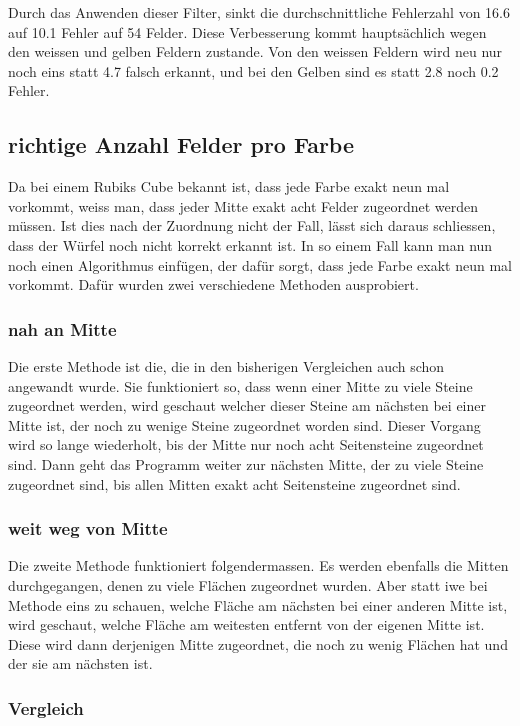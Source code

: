 \documentclass[a4paper, 12pt]{article}
\begin{document}
Durch das Anwenden dieser Filter, sinkt die durchschnittliche Fehlerzahl von 16.6 auf 10.1 Fehler auf 54 Felder. Diese Verbesserung kommt hauptsächlich wegen den weissen und gelben Feldern zustande. Von den weissen Feldern wird neu nur noch eins statt 4.7 falsch erkannt, und bei den Gelben sind es statt 2.8 noch 0.2 Fehler.
\subsection{richtige Anzahl Felder pro Farbe}
Da bei einem Rubiks Cube bekannt ist, dass jede Farbe exakt neun mal vorkommt, weiss man, dass jeder Mitte exakt acht Felder zugeordnet werden müssen. Ist dies nach der Zuordnung nicht der Fall, lässt sich daraus schliessen, dass der Würfel noch nicht korrekt erkannt ist. In so einem Fall kann man nun noch einen Algorithmus einfügen, der dafür sorgt, dass jede Farbe exakt neun mal vorkommt. Dafür wurden zwei verschiedene Methoden ausprobiert.
\subsubsection{nah an Mitte}
Die erste Methode ist die, die in den bisherigen Vergleichen auch schon angewandt wurde. Sie funktioniert so, dass wenn einer Mitte zu viele Steine zugeordnet werden, wird geschaut welcher dieser Steine am nächsten bei einer Mitte ist, der noch zu wenige Steine zugeordnet worden sind. Dieser Vorgang wird so lange wiederholt, bis der Mitte nur noch acht Seitensteine zugeordnet sind. Dann geht das Programm weiter zur nächsten Mitte, der zu viele Steine zugeordnet sind, bis allen Mitten exakt acht Seitensteine zugeordnet sind. 

\subsubsection{weit weg von Mitte}
Die zweite Methode funktioniert folgendermassen. Es werden ebenfalls die Mitten durchgegangen, denen zu viele Flächen zugeordnet wurden. Aber statt iwe bei Methode eins zu schauen, welche Fläche am nächsten bei einer anderen Mitte ist, wird geschaut, welche Fläche am weitesten entfernt von der eigenen Mitte ist. Diese wird dann derjenigen Mitte zugeordnet, die noch zu wenig Flächen hat und der sie am nächsten ist.

\subsubsection{Vergleich}
\end{document}
